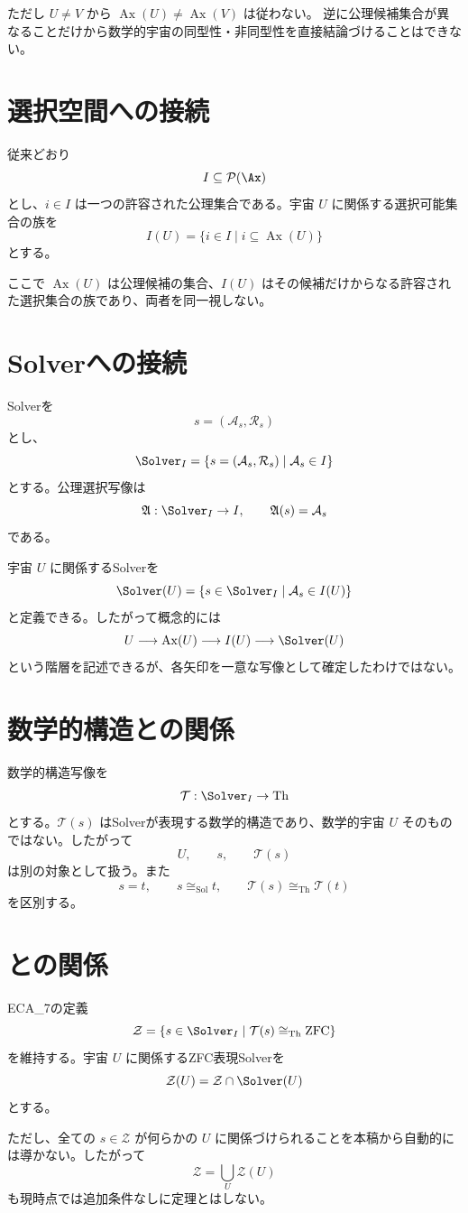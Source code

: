 \documentclass[11pt,a4paper]{article}
\begin{document}
ただし $U \ne V$ から $\operatorname{Ax}(U)\ne\operatorname{Ax}(V)$ は従わない。
逆に公理候補集合が異なることだけから数学的宇宙の同型性・非同型性を直接結論づけることはできない。

\section{選択空間への接続}
従来どおり
\[
I\subseteq\mathcal{P}(\Ax)
\]
とし、$i\in I$ は一つの許容された公理集合である。宇宙 $U$ に関係する選択可能集合の族を
\[
I(U)=\{i\in I\mid i\subseteq\operatorname{Ax}(U)\}
\]
とする。

ここで $\operatorname{Ax}(U)$ は公理候補の集合、$I(U)$ はその候補だけからなる許容された選択集合の族であり、両者を同一視しない。

\section{Solverへの接続}
Solverを
\[
s=(\mathcal{A}_s,\mathcal{R}_s)
\]
とし、
\[
\Solver_I=\{s=(\mathcal{A}_s,\mathcal{R}_s)\mid\mathcal{A}_s\in I\}
\]
とする。公理選択写像は
\[
\mathfrak A:\Solver_I\to I,
\qquad
\mathfrak A(s)=\mathcal{A}_s
\]
である。

宇宙 $U$ に関係するSolverを
\[
\Solver(U)=\{s\in\Solver_I\mid\mathcal{A}_s\in I(U)\}
\]
と定義できる。したがって概念的には
\[
U\longrightarrow\operatorname{Ax}(U)\longrightarrow I(U)\longrightarrow\Solver(U)
\]
という階層を記述できるが、各矢印を一意な写像として確定したわけではない。

\section{数学的構造との関係}
数学的構造写像を
\[
\mathcal{T}:\Solver_I\to\mathrm{Th}
\]
とする。$\mathcal{T}(s)$ はSolverが表現する数学的構造であり、数学的宇宙 $U$ そのものではない。したがって
\[
U,\qquad s,\qquad\mathcal{T}(s)
\]
は別の対象として扱う。また
\[
s=t,\qquad s\cong_{\mathrm{Sol}}t,\qquad \mathcal{T}(s)\cong_{\mathrm{Th}}\mathcal{T}(t)
\]
を区別する。

\section{との関係}
ECA_7の定義
\[
\mathcal{Z}=\{s\in\Solver_I\mid\mathcal{T}(s)\cong_{\mathrm{Th}}\mathrm{ZFC}\}
\]
を維持する。宇宙 $U$ に関係するZFC表現Solverを
\[
\mathcal{Z}(U)=\mathcal{Z}\cap\Solver(U)
\]
とする。

ただし、全ての $s\in\mathcal{Z}$ が何らかの $U$ に関係づけられることを本稿から自動的には導かない。したがって
\[
\mathcal{Z}=\bigcup_U\mathcal{Z}(U)
\]
も現時点では追加条件なしに定理とはしない。
\end{document}
